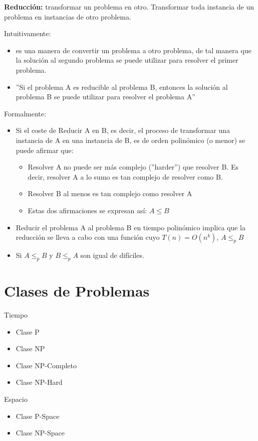 \textbf{Reducción:} transformar un problema en otro. Transformar toda instancia de un problema en instancias de otro problema.

Intuitivamente:
\begin{itemize}
  \item es una manera de convertir un problema a otro problema, de tal manera que la solución al segundo problema se puede utilizar para resolver el primer problema.
  \item ''Si el problema A es reducible al problema B, entonces la solución al problema B se
  puede utilizar para resolver el problema A''
\end{itemize}

Formalmente:
\begin{itemize}
  \item Si el coste de Reducir A en B, es decir, el proceso de transformar una instancia de A en una instancia de B, es de orden polinómico (o menor) se puede afirmar que:
  \begin{itemize}
    \item Resolver A no puede ser más complejo (''harder'') que resolver B. Es decir, resolver A a lo sumo es tan complejo de resolver como B.
    \item Resolver B al menos es tan complejo como resolver A
    \item Estas dos afirmaciones se expresan así: $A \leq B$
  \end{itemize}
  \item Reducir el problema A al problema B en tiempo polinómico implica que la reducción se lleva a cabo con una función cuyo $T(n)=O(n^k)$, $A \leq_p B$
  \item Si $A \leq_p B$ y $B \leq_p A$ son igual de difíciles.
\end{itemize}

\section{Clases de Problemas}
Tiempo
\begin{itemize}
  \item Clase P
  \item Clase NP
  \item Clase NP-Completo 
  \item Clase NP-Hard
\end{itemize}

Espacio
\begin{itemize}
  \item Clase P-Space
  \item Clase NP-Space
\end{itemize}

